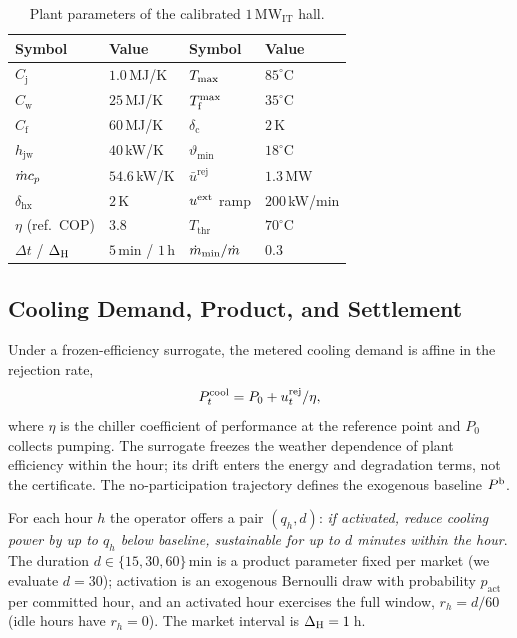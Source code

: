 \begin{table}[t]
\centering
\caption{Plant parameters of the calibrated $1$\,MW$_{\mathrm{IT}}$ hall.}
\label{tab:params}
\setlength{\tabcolsep}{3.5pt}
\scriptsize
\begin{tabular}{llll}
\toprule
\textbf{Symbol} & \textbf{Value} & \textbf{Symbol} & \textbf{Value} \\
\midrule
$C_\mathrm{j}$ & $1.0$\,MJ/K & $T_{\max}$ & $85^\circ$C \\
$C_\mathrm{w}$ & $25$\,MJ/K & $\Tf^{\max}$ & $35^\circ$C \\
$C_\mathrm{f}$ & $60$\,MJ/K & $\delta_{\mathrm{c}}$ & $2$\,K \\
$h_{\mathrm{jw}}$ & $40$\,kW/K & $\vartheta_{\min}$ & $18^\circ$C \\
$\mdot c_p$ & $54.6$\,kW/K & $\bar u^{\mathrm{rej}}$ & $1.3$\,MW \\
$\delta_{\mathrm{hx}}$ & $2$\,K & $u^{\mathrm{ext}}$ ramp & $200$\,kW/min \\
$\eta$ (ref.\ COP) & $3.8$ & $T_{\mathrm{thr}}$ & $70^\circ$C \\
$\Delta t$ / $\Delta_{\mathrm{H}}$ & $5$\,min / $1$\,h & $\mdot_{\min}/\mdot$ & $0.3$ \\
\bottomrule
\end{tabular}
\vspace{-3mm}
\end{table}

\vspace{-3mm}
\subsection{Cooling Demand, Product, and Settlement}
\label{subsec:product}

Under a frozen-efficiency surrogate, the metered cooling demand is affine in
the rejection rate,
\begin{equation}
P^{\mathrm{cool}}_t = P_0 + u^{\mathrm{rej}}_t/\eta,
\label{eq:coolpower}
\end{equation}
where $\eta$ is the chiller coefficient of performance at the reference point
and $P_0$ collects pumping. The surrogate freezes the weather dependence of
plant efficiency within the hour; its drift enters the energy and degradation
terms, not the certificate. The no-participation trajectory defines the
exogenous baseline $P^{\mathrm{b}}$.

For each hour $h$ the operator offers a pair $(q_h, d)$: \emph{if activated,
reduce cooling power by up to $q_h$ below baseline, sustainable for up to $d$
minutes within the hour}. The duration $d\in\{15,30,60\}$\,min is a product
parameter fixed per market (we evaluate $d=30$); activation is an exogenous
Bernoulli draw with probability $p_{\mathrm{act}}$ per committed hour, and an
activated hour exercises the full window, $r_h = d/60$ (idle hours have
$r_h=0$). The market interval is $\Delta_{\mathrm{H}} = 1$\,h.

